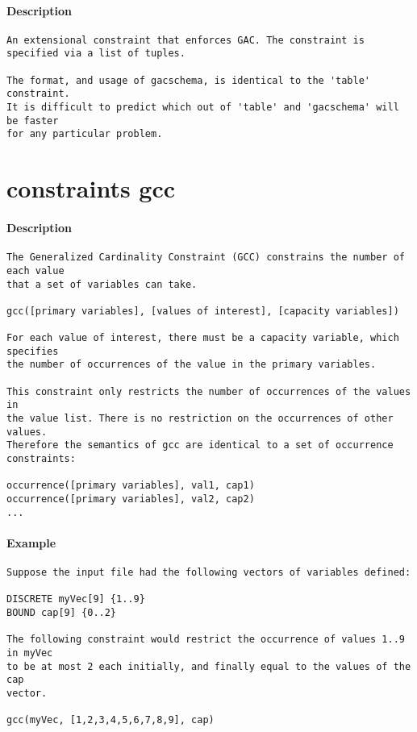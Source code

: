 \paragraph{Description}
{\footnotesize
\begin{verbatim}
An extensional constraint that enforces GAC. The constraint is
specified via a list of tuples.

The format, and usage of gacschema, is identical to the 'table' constraint.
It is difficult to predict which out of 'table' and 'gacschema' will be faster
for any particular problem.
\end{verbatim}
}
\section{constraints gcc}
\paragraph{Description}
{\footnotesize
\begin{verbatim}
The Generalized Cardinality Constraint (GCC) constrains the number of each value
that a set of variables can take.

gcc([primary variables], [values of interest], [capacity variables])

For each value of interest, there must be a capacity variable, which specifies
the number of occurrences of the value in the primary variables.

This constraint only restricts the number of occurrences of the values in
the value list. There is no restriction on the occurrences of other values.
Therefore the semantics of gcc are identical to a set of occurrence 
constraints:

occurrence([primary variables], val1, cap1)
occurrence([primary variables], val2, cap2)
...
\end{verbatim}
}
\paragraph{Example}
{\footnotesize
\begin{verbatim}
Suppose the input file had the following vectors of variables defined:

DISCRETE myVec[9] {1..9}
BOUND cap[9] {0..2}

The following constraint would restrict the occurrence of values 1..9 in myVec
to be at most 2 each initially, and finally equal to the values of the cap
vector.

gcc(myVec, [1,2,3,4,5,6,7,8,9], cap)
\end{verbatim}
}
